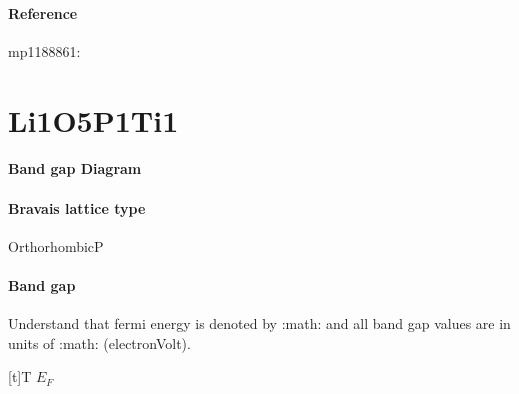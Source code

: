 \documentclass[letterpaper,10pt,english]{sphinxmanual}
\begin{document}
\subsubsection*{Reference}

\sphinxAtStartPar
mp\sphinxhyphen{}1188861: 

\sphinxstepscope


\chapter{Li1O5P1Ti1}
\label{\detokenize{Li1O5P1Ti1/Li1O5P1Ti1:li1o5p1ti1}}\label{\detokenize{Li1O5P1Ti1/Li1O5P1Ti1::doc}}\subsubsection*{Band gap Diagram}

\noindent{}
\subsubsection*{Bravais lattice type}

\sphinxAtStartPar
OrthorhombicP
\subsubsection*{Band gap}

\sphinxAtStartPar
Understand that fermi energy is denoted by :math: and all band gap values are in units of :math: (electron\sphinxhyphen{}Volt).


\begin{savenotes}\sphinxattablestart
\sphinxthistablewithglobalstyle
\centering
\begin{tabulary}{\linewidth}[t]{T}
\sphinxtoprule
\sphinxstyletheadfamily 
\sphinxAtStartPar
\(E_F\)
\\
\sphinxmidrule
\sphinxtableatstartofbodyhook
{}
\\
\sphinxbottomrule
\end{tabulary}
\sphinxtableafterendhook\par
\sphinxattableend\end{savenotes}
\end{document}
